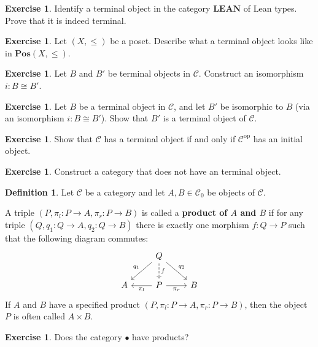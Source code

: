 \documentclass[a4paper,10pt]{scrartcl}
\theoremstyle{plain}
\theoremstyle{definition}
\newtheorem{dfn}[thm]{Definition}
\newtheorem{exer}[thm]{Exercise}
\newcommand{\Cat}[1]{\mathcal{#1}}
\newcommand{\CC}{\Cat{C}}
\newcommand{\Catb}[1]{\mathbf{#1}}
\newcommand{\POS}{\Catb{Pos}}
\newcommand{\LEAN}{\Catb{LEAN}}
\newcommand{\Ob}[1]{{#1}_0}
\newcommand{\op}[1]{\ensuremath{{#1}^\text{op}}}
\newcommand{\projl}{\ensuremath{\pi_l}}
\newcommand{\projr}{\ensuremath{\pi_r}}
\begin{document}
\begin{exer}
  Identify a terminal object in the category $\LEAN$ of Lean types.
  Prove that it is indeed terminal.
\end{exer}

\begin{exer}
  Let $(X,\leq)$ be a poset. Describe what a terminal object looks like in  $\POS(X,\leq)$.
\end{exer}

\begin{exer}\label{exer:terminal-unique}
  Let $B$ and $B'$ be terminal objects in $\CC$. Construct an isomorphism $i : B \cong B'$.
\end{exer}

\begin{exer}
  Let $B$ be a terminal object in $\CC$, and let $B'$ be isomorphic to $B$ (via an isomorphism $i : B \cong B'$).
  Show that $B'$ is a terminal object of $\CC$.
\end{exer}

\begin{exer}
  Show that $\CC$ has a terminal object if and only if $\op\CC$ has an initial object.
\end{exer}

\begin{exer}
  Construct a category that does not have an terminal object.
\end{exer}


\begin{dfn}
  Let $\CC$ be a category and let $A,B \in \Ob\CC$ be objects of $\CC$.

  A triple $(P,\projl : P \to A ,\projr : P \to B)$ is called a \textbf{product of $A$ and $B$} if for any triple $(Q,q_1 : Q \to A, q_2 : Q \to B)$ there is exactly one morphism $f : Q \to P$ such that the following diagram commutes:
  \[
    \begin{tikzcd}
      &
      Q \ar[ld, "q_1"'] \ar[rd, "q_2"] \ar[d, dashed, "f"]
      &
      \\
      A
      &
      P \ar[l, "\projl"] \ar[r, "\projr"']
      &
      B
    \end{tikzcd}
  \]
  If $A$ and $B$ have a specified product $(P,\projl : P \to A ,\projr : P \to B)$, then the object $P$ is often called $A \times B$.
\end{dfn}

\begin{exer}
  Does the category $\bullet$ have products?
\end{exer}
\end{document}
